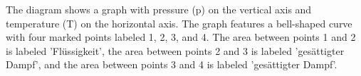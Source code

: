 The diagram shows a graph with pressure (p) on the vertical axis and temperature (T) on the horizontal axis. The graph features a bell-shaped curve with four marked points labeled 1, 2, 3, and 4. The area between points 1 and 2 is labeled 'Flüssigkeit', the area between points 2 and 3 is labeled 'gesättigter Dampf', and the area between points 3 and 4 is labeled 'gesättigter Dampf'.